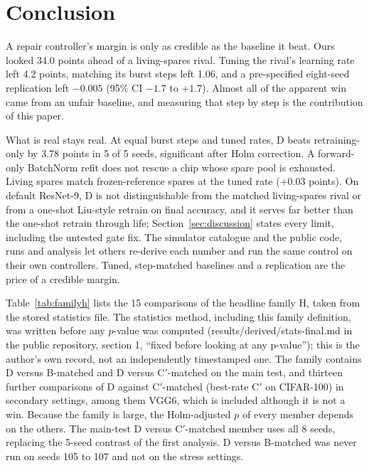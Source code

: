 \documentclass[journal]{IEEEtran}
\begin{document}
\section{Conclusion}
\label{sec:conclusion}
A repair controller's margin is only as credible as the baseline it beat.
Ours looked 34.0 points ahead of a living-spares rival.
Tuning the rival's learning rate left 4.2 points, matching its burst steps left 1.06, and a pre-specified eight-seed replication left $-0.005$ (95\% CI $-1.7$ to $+1.7$).
Almost all of the apparent win came from an unfair baseline, and measuring that step by step is the contribution of this paper.

What is real stays real.
At equal burst steps and tuned rates, D beats retraining-only by 3.78 points in 5 of 5 seeds, significant after Holm correction.
A forward-only BatchNorm refit does not rescue a chip whose spare pool is exhausted.
Living spares match frozen-reference spares at the tuned rate (+0.03 points).
On default ResNet-9, D is not distinguishable from the matched living-spares rival or from a one-shot Liu-style retrain on final accuracy, and it serves far better than the one-shot retrain through life; Section~\ref{sec:discussion} states every limit, including the untested gate fix.
The simulator catalogue and the public code, runs and analysis let others re-derive each number and run the same control on their own controllers.
Tuned, step-matched baselines and a replication are the price of a credible margin.

\label{app:familyh}
Table~\ref{tab:familyh} lists the 15 comparisons of the headline family H, taken from the stored statistics file.
The statistics method, including this family definition, was written before any $p$-value was computed (results/derived/stats-final.md in the public repository, section 1, ``fixed before looking at any p-value''); this is the author's own record, not an independently timestamped one.
The family contains D versus B-matched and D versus C$'$-matched on the main test, and thirteen further comparisons of D against C$'$-matched (best-rate C$'$ on CIFAR-100) in secondary settings, among them VGG6, which is included although it is not a win.
Because the family is large, the Holm-adjusted $p$ of every member depends on the others.
The main-test D versus C$'$-matched member uses all 8 seeds, replacing the 5-seed contrast of the first analysis.
D versus B-matched was never run on seeds 105 to 107 and not on the stress settings.
\end{document}
